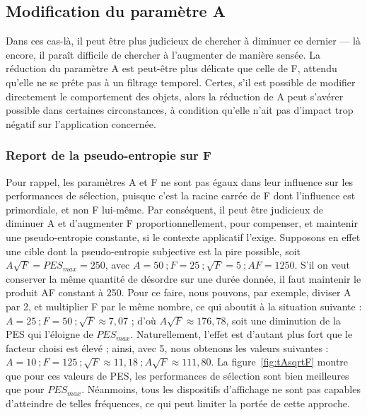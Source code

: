 	\subsection{Modification du paramètre A}
	Dans ces cas-là, il peut être plus judicieux de chercher à diminuer ce dernier --- là encore, il paraît difficile de chercher à l'augmenter de manière sensée. La réduction du paramètre A est peut-être plus délicate que celle de F, attendu qu'elle ne se prête pas à un filtrage temporel. Certes, s'il est possible de modifier directement le comportement des objets, alors la réduction de A peut s'avérer possible dans certaines circonstances, à condition qu'elle n'ait pas d'impact trop négatif sur l'application concernée.
	
	\subsubsection{Report de la pseudo-entropie sur F}
	Pour rappel, les paramètres A et F ne sont pas égaux dans leur influence sur les performances de sélection, puisque c'est la racine carrée de F dont l'influence est primordiale, et non F lui-même. Par conséquent, il peut être judicieux de diminuer A et d'augmenter F proportionnellement, pour compenser, et maintenir une pseudo-entropie constante, si le contexte applicatif l'exige. Supposons en effet une cible dont la pseudo-entropie subjective est la \og pire \fg{} possible, soit $A\sqrt{F} = PES_{max} = 250$, avec $A = 50~; F = 25~; \sqrt{F} = 5~; AF = 1250$. S'il on veut conserver la même quantité de désordre sur une durée donnée, il faut maintenir le produit AF constant à 250. Pour ce faire, nous pouvons, par exemple, diviser A par 2, et multiplier F par le même nombre, ce qui aboutit à la situation suivante : $A = 25~; F = 50~; \sqrt{F} \approx 7,07$ ; d'où $A\sqrt{F} \approx 176,78$, soit une diminution de la PES qui l'éloigne de $PES_{max}$. Naturellement, l'effet est d'autant plus fort que le facteur choisi est élevé ; ainsi, avec 5, nous obtenons les valeurs suivantes : $A = 10~; F = 125~; \sqrt{F} \approx 11,18~; A\sqrt{F} \approx 111,80$. La figure~\ref{fig:tAsqrtF} montre que pour ces valeurs de PES, les performances de sélection sont bien meilleures que pour $PES_{max}$. Néanmoins, tous les dispositifs d'affichage ne sont pas capables d'atteindre de telles fréquences, ce qui peut limiter la portée de cette approche.
	
